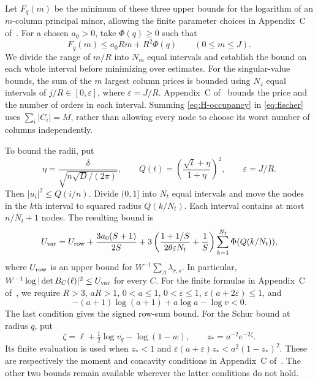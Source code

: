 Let $F_q(m)$ be the minimum of these three upper bounds for the logarithm
of an $m$-column principal minor, allowing the finite parameter choices in
Appendix~C of~\cite{chung498}. For a chosen $a_0>0$, take
$\Phi(q)\geq0$ such that
\begin{equation}\label{eq:H-occupancy}
 F_q(m)\leq a_0Rm+R^2\Phi(q)\qquad(0\leq m\leq J).
\end{equation}
We divide the range of $m/R$ into $N_m$ equal intervals and establish
the bound on each whole interval before minimizing over estimates.
For the singular-value bounds, the sum of the $m$ largest column prices
is bounded using $N_z$ equal intervals of $j/R\in[0,\varepsilon]$,
where $\varepsilon=J/R$. Appendix~C of~\cite{chung498} bounds the price and the number of orders in each
interval. Summing \eqref{eq:H-occupancy} in
\eqref{eq:fischer} uses $\sum_i|C_i|=M$, rather than allowing every node to
choose its worst number of columns independently.

To bound the radii, put
\[
 \eta=\frac{\delta}{\sqrt{n\sqrt D/(2\pi)}},\qquad
 Q(t)=\left(\frac{\sqrt t+\eta}{1+\eta}\right)^2,
 \qquad \varepsilon=J/R.
\]
Then $|u_i|^2\leq Q(i/n)$. Divide $(0,1]$ into $N_t$ equal intervals and
move the nodes in the $k$th interval to squared radius $Q(k/N_t)$.
Each interval contains at most $n/N_t+1$ nodes. The resulting bound is
\begin{equation}\label{eq:metric-mesh}
 U_{\rm var}=U_{\rm row}+\frac{3a_0(S+1)}{2S}
 +3\left(\frac{1+1/S}{2\theta\varepsilon N_t}+\frac1S\right)
       \sum_{k=1}^{N_t}\Phi(Q(k/N_t)),
\end{equation}
where $U_{\rm row}$ is an upper bound for
$W^{-1}\sum_\Lambda\lambda_{r,s}$. In particular,
$W^{-1}\log|\det B_C(\ell)|^2\leq U_{\rm var}$ for every $C$.
For the finite formulas in Appendix~C of~\cite{chung498},
we require $R>3$, $aR>1$, $0<a\leq1$, $0<\varepsilon\leq1$,
$\varepsilon(a+2\varepsilon)\leq1$, and
\[
 -(a+1)\log(a+1)+a\log a-\log v<0.
\]
The last condition gives the signed row-sum bound. For the Schur bound at
radius $q$, put
\[
 \zeta=\ell+\tfrac12\log v_q-\log(1-w),\qquad z_*=a^{-2}e^{-2\zeta}.
\]
Its finite evaluation is used when $z_*<1$ and
$\varepsilon(a+\varepsilon)z_*<a^2(1-z_*)^2$. These are respectively the
moment and concavity conditions in Appendix~C of~\cite{chung498}. The other
two bounds remain available wherever the latter conditions do not hold.

